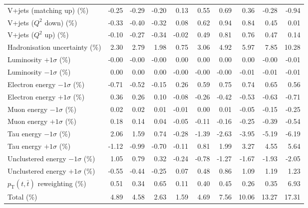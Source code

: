 \begin{table}[htbp]
{\begin{tabular}{lrrrrrrrrr}
V+jets (matching up) (\%) & -0.25 & -0.29 & -0.20 & 0.13 & 0.55 & 0.69 & 0.36 & -0.28 & -0.94 \\ 
V+jets ($Q^{2}$ down) (\%) & -0.33 & -0.40 & -0.32 & 0.08 & 0.62 & 0.94 & 0.84 & 0.45 & 0.01 \\ 
V+jets ($Q^{2}$ up) (\%) & -0.10 & -0.27 & -0.34 & -0.02 & 0.49 & 0.81 & 0.76 & 0.47 & 0.14 \\ 
Hadronisation uncertainty (\%) & 2.30 & 2.79 & 1.98 & 0.75 & 3.06 & 4.92 & 5.97 & 7.85 & 10.28 \\ 
Luminosity $+1\sigma$ (\%) & -0.00 & -0.00 & -0.00 & 0.00 & 0.00 & 0.00 & 0.00 & -0.00 & -0.01 \\ 
Luminosity $-1\sigma$ (\%) & 0.00 & 0.00 & 0.00 & -0.00 & -0.00 & -0.00 & -0.01 & -0.01 & -0.01 \\ 
Electron energy $-1\sigma$ (\%) & -0.71 & -0.52 & -0.15 & 0.26 & 0.59 & 0.75 & 0.74 & 0.65 & 0.56 \\ 
Electron energy $+1\sigma$ (\%) & 0.36 & 0.26 & 0.10 & -0.08 & -0.26 & -0.42 & -0.53 & -0.63 & -0.71 \\ 
Muon energy $-1\sigma$ (\%) & 0.02 & 0.02 & 0.01 & -0.01 & 0.00 & 0.01 & -0.05 & -0.15 & -0.25 \\ 
Muon energy $+1\sigma$ (\%) & 0.18 & 0.14 & 0.04 & -0.05 & -0.11 & -0.16 & -0.25 & -0.39 & -0.54 \\ 
Tau energy $-1\sigma$ (\%) & 2.06 & 1.59 & 0.74 & -0.28 & -1.39 & -2.63 & -3.95 & -5.19 & -6.19 \\ 
Tau energy $+1\sigma$ (\%) & -1.12 & -0.99 & -0.70 & -0.11 & 0.81 & 1.99 & 3.27 & 4.55 & 5.64 \\ 
Unclustered energy $-1\sigma$ (\%) & 1.05 & 0.79 & 0.32 & -0.24 & -0.78 & -1.27 & -1.67 & -1.93 & -2.05 \\ 
Unclustered energy $+1\sigma$ (\%) & -0.55 & -0.44 & -0.25 & 0.07 & 0.48 & 0.86 & 1.09 & 1.19 & 1.23 \\ 
$p_\mathrm{T}(t,\bar{t})$ reweighting (\%) & 0.51 & 0.34 & 0.65 & 0.11 & 0.40 & 0.45 & 0.26 & 0.35 & 6.93 \\ 
\hline 
Total (\%) & 4.89  & 4.58  & 2.63  & 1.59  & 4.69  & 7.56  & 10.06  & 13.27  & 17.31 \\ 
\hline 
\end{tabular}
}
\end{table}

